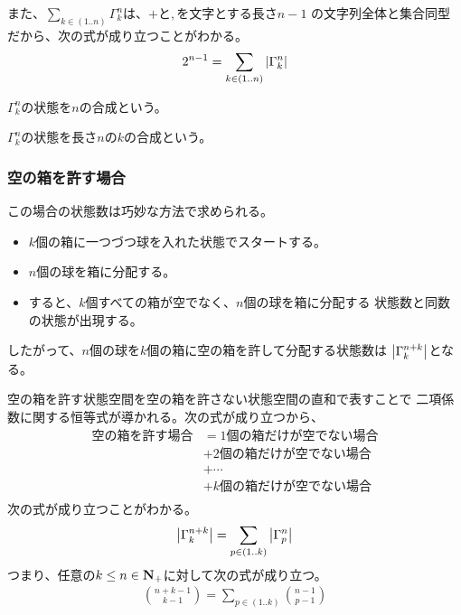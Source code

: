 			また、$\sum_{k\in(1..n)}\Gamma_k^n$は、$+$と$,$を文字とする長さ$n-1$
			の文字列全体と集合同型だから、次の式が成り立つことがわかる。
			\begin{equation*}\begin{split} %
				2^{n-1} = \sum_{k\in(1..n)}\zettai{\Gamma_k^n}
			\end{split}\end{equation*} %

			$\Gamma_k^n$の状態を$n$の合成という。

			\begin{definition}\label{def:自然数の合成（Compositioin）} %
				$\Gamma_k^n$の状態を長さ$n$の$k$の合成という。
			\end{definition} %
		\subsubsection{空の箱を許す場合}\label{s3:空の箱を許す場合} %
			この場合の状態数は巧妙な方法で求められる。
			\begin{itemize}\setlength{\itemsep}{-1mm} %
				\item $k$個の箱に一つづつ球を入れた状態でスタートする。
				\item $n$個の球を箱に分配する。
				\item すると、$k$個すべての箱が空でなく、$n$個の球を箱に分配する
				状態数と同数の状態が出現する。
			\end{itemize} %
			したがって、$n$個の球を$k$個の箱に空の箱を許して分配する状態数は
			$\left|{\Gamma_k^{n+k}}\right|$となる。

			空の箱を許す状態空間を空の箱を許さない状態空間の直和で表すことで
			二項係数に関する恒等式が導かれる。次の式が成り立つから、
			\begin{equation*}\begin{split} %
				\text{空の箱を許す場合} &= 1\text{個の箱だけが空でない場合} \\
				&+ 2\text{個の箱だけが空でない場合} \\
				&+ \cdots \\
				&+ k\text{個の箱だけが空でない場合} \\
			\end{split}\end{equation*} %
			次の式が成り立つことがわかる。
			\begin{equation*}\begin{split} %
				\zettai{\Gamma_k^{n+k}} = \sum_{p\in(1..k)}\zettai{\Gamma_p^n}
			\end{split}\end{equation*} %
			つまり、任意の$k\le n\in {\mathbf{N}}_+$に対して次の式が成り立つ。
			\begin{equation*}\begin{split} %
				\binom{n+k-1}{k-1} = \sum_{p\in(1..k)}\binom{n-1}{p-1}
			\end{split}\end{equation*} %


